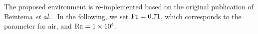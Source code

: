 The proposed environment is re-implemented based on the original publication of Beintema \textit{et al.} \cite{beintema2020}. In the following, we set $\text{Pr}=0.71$, which corresponds to the parameter for air, and $\text{Ra} = \num{1e4}$.
%
%
%
%
%
%
